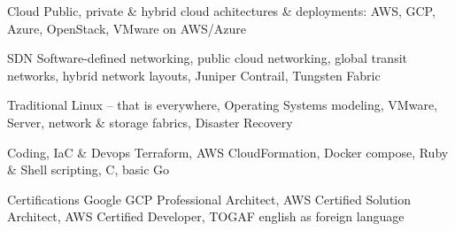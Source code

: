 
\begin{cvskills}

  \cvskill
    {Cloud} %
	{Public, private \& hybrid cloud achitectures \& deployments: \newline AWS, GCP, Azure, OpenStack, VMware on AWS/Azure}

  \cvskill
    {SDN} %
    {Software-defined networking, public cloud networking, global transit networks, \newline hybrid network layouts, Juniper Contrail, Tungsten Fabric}

  \cvskill
    {Traditional} %
	{Linux -- that is everywhere, Operating Systems modeling, VMware, \newline Server, network \& storage fabrics, Disaster Recovery}

  \cvskill
	{Coding, IaC \& Devops} %
    {Terraform, AWS CloudFormation, Docker compose, Ruby \& Shell scripting, C, basic Go}

  \cvskill
    {Certifications} %
    {Google GCP Professional Architect, AWS Certified Solution Architect, \newline AWS Certified Developer, TOGAF english as foreign language}

\end{cvskills}
